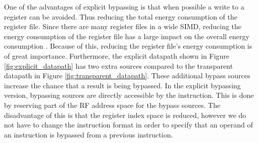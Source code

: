

One of the advantages of explicit bypassing is that when possible a write to a register can be avoided. Thus reducing the total energy consumption of the register file. Since there are many register files in a wide SIMD, reducing the energy consumption of the register file has a large impact on the overall energy consumption \cite{dongrio1}. Because of this, reducing the register file's energy consumption is of great importance. Furthermore, the explicit datapath shown in Figure \ref{fig:explicit_datapath} has two extra sources compared to the transparent datapath in Figure \ref{fig:transparent_datapath}. These additional bypass sources increase the chance that a result is being bypassed. In the explicit bypassing version, bypassing sources are directly accessible by the instruction. This is done by reserving part of the RF address space for the bypass sources. The disadvantage of this is that the register index space is reduced, however we do not have to change the instruction format in order to specify that an operand of an instruction is bypassed from a previous instruction.

